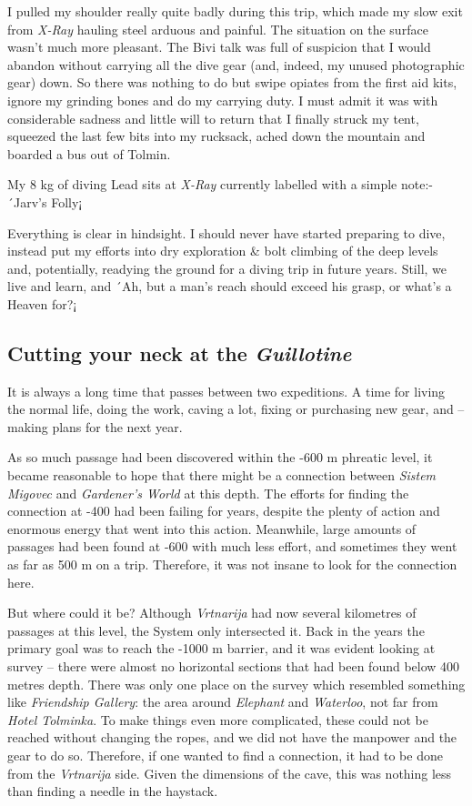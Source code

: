 I pulled my shoulder really quite badly during this trip, which made my
slow exit from \emph{X-Ray} hauling steel arduous and painful. The
situation on the surface wasn't much more pleasant. The Bivi talk was
full of suspicion that I would abandon without carrying all the dive
gear (and, indeed, my unused photographic gear) down. So there was
nothing to do but swipe opiates from the first aid kits, ignore my
grinding bones and do my carrying duty. I must admit it was with
considerable sadness and little will to return that I finally struck my
tent, squeezed the last few bits into my rucksack, ached down the
mountain and boarded a bus out of Tolmin.

My 8 kg of diving Lead sits at \emph{X-Ray} currently labelled with a
simple note:- ´Jarv's Folly¡

Everything is clear in hindsight. I should never have started preparing
to dive, instead put my efforts into dry exploration \& bolt climbing of
the deep levels and, potentially, readying the ground for a diving trip
in future years. Still, we live and learn, and ´Ah, but a man's reach
should exceed his grasp, or what's a Heaven for?¡



\subsection{\texorpdfstring{Cutting your neck at the
\emph{Guillotine}}{Cutting your neck at the Guillotine}}

It is always a long time that passes between two expeditions. A time for
living the normal life, doing the work, caving a lot, fixing or
purchasing new gear, and -- making plans for the next year.

As so much passage had been discovered within the -600 m phreatic level,
it became reasonable to hope that there might be a connection between
\emph{Sistem Migovec} and \emph{Gardener's World} at this depth. The
efforts for finding the connection at -400 had been failing for years,
despite the plenty of action and enormous energy that went into this
action. Meanwhile, large amounts of passages had been found at -600 with
much less effort, and sometimes they went as far as 500 m on a trip.
Therefore, it was not insane to look for the connection here.

But where could it be? Although \emph{Vrtnarija} had now several
kilometres of passages at this level, the System only intersected it.
Back in the years the primary goal was to reach the -1000 m barrier, and
it was evident looking at survey -- there were almost no horizontal
sections that had been found below 400 metres depth. There was only one
place on the survey which resembled something like \emph{Friendship
Gallery}: the area around \emph{Elephant} and \emph{Waterloo}, not far
from \emph{Hotel Tolminka}. To make things even more complicated, these
could not be reached without changing the ropes, and we did not have the
manpower and the gear to do so. Therefore, if one wanted to find a
connection, it had to be done from the \emph{Vrtnarija} side. Given the
dimensions of the cave, this was nothing less than finding a needle in
the haystack.

